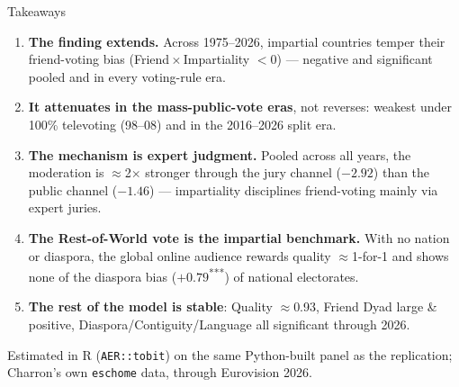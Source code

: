 \documentclass[aspectratio=169,10pt]{beamer}
\newcommand{\rep}[1]{{\color{repcol}#1}}
\newcommand{\spl}[1]{{\color{splitcol}#1}}
\newcommand{\sg}[1]{\textsuperscript{#1}}
\begin{document}
\begin{frame}{Takeaways}
  \begin{enumerate}
    \item \textbf{The finding extends.} Across 1975--2026, impartial countries temper
      their friend-voting bias (Friend\,$\times$\,Impartiality $<0$) --- negative and
      significant pooled and in every voting-rule era.
    \item \textbf{It attenuates in the mass-public-vote eras}, not reverses: weakest
      under 100\% televoting (98--08) and in the \spl{2016--2026 split era}.
    \item \textbf{The mechanism is expert judgment.} Pooled across all years, the
      moderation is $\approx$2$\times$ stronger through the \color{jurycol}jury channel
      \color{black}($-2.92$) than the \spl{public channel} ($-1.46$) --- impartiality
      disciplines friend-voting mainly via expert juries.
    \item \textbf{The Rest-of-World vote is the impartial benchmark.} With no nation or
      diaspora, the global online audience rewards quality $\approx$1-for-1 and shows
      none of the diaspora bias ($+0.79$\sg{***}) of national electorates.
    \item \textbf{The rest of the model is stable}: Quality $\approx$0.93, Friend Dyad
      large \& positive, Diaspora/Contiguity/Language all significant through 2026.
  \end{enumerate}
  \vspace{4pt}
  \footnotesize\rep{Estimated in R (\texttt{AER::tobit}) on the same Python-built panel
  as the replication; Charron's own \texttt{eschome} data, through Eurovision 2026.}
\end{frame}
\end{document}
